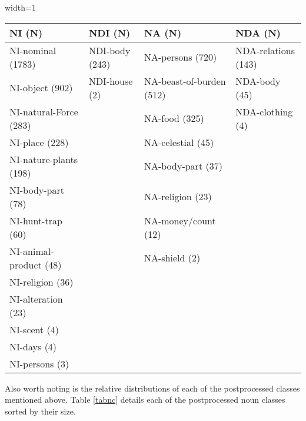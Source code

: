 \begin{table*}[h]
\begin{adjustbox}{width=1\textwidth}
\begin{tabular}{llll}
\toprule
NI (N)                 & NDI (N)        & NA (N)                   & NDA (N)             \\
\midrule
NI-nominal (1783)      & NDI-body (243) & NA-persons (720)         & NDA-relations (143) \\
NI-object (902)        & NDI-house (2)  & NA-beast-of-burden (512) & NDA-body (45)       \\
NI-natural-Force (283) &                & NA-food (325)            & NDA-clothing (4)    \\
NI-place (228)         &                & NA-celestial (45)        &                     \\
NI-nature-plants (198) &                & NA-body-part (37)        &                     \\
NI-body-part (78)      &                & NA-religion (23)         &                     \\
NI-hunt-trap (60)      &                & NA-money/count (12)      &                     \\
NI-animal-product (48) &                & NA-shield (2)            &                     \\
NI-religion (36)       &                &                          &                     \\
NI-alteration (23)     &                &                          &                     \\
NI-scent (4)           &                &                          &                     \\
NI-days (4)            &                &                          &                     \\
NI-persons (3)         &                &                          &                    \\
\bottomrule
\end{tabular}
  \end{adjustbox}

\caption{Manually Adjusted Noun Classes}
\label{tabnc}
\end{table*}

Also worth noting is the relative distributions of each of the postprocessed classes mentioned above. Table \ref{tabnc} details each of the postprocessed noun classes sorted by their size. 

